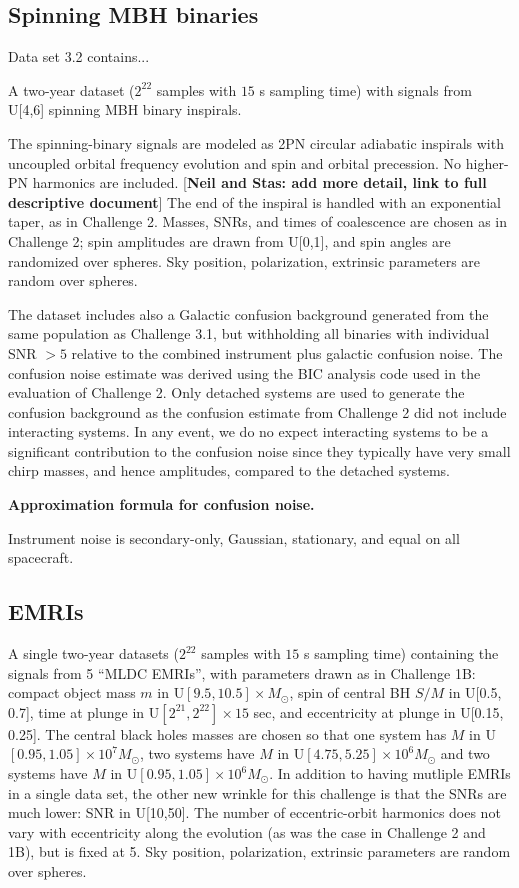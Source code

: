 \documentclass{iopart}
\begin{document}
\subsection{Spinning MBH binaries}
\label{sec:ch3mbh}

Data set 3.2 contains...

A two-year dataset ($2^{22}$ samples with $15$ s sampling time) with signals from U[4,6] spinning MBH binary inspirals.

The spinning-binary signals are modeled as 2PN circular adiabatic inspirals with uncoupled orbital frequency evolution
and spin and orbital precession. No higher-PN harmonics are included. [\textbf{Neil and Stas: add more detail, link to full descriptive document}] The end of the inspiral is handled with an exponential taper, as in Challenge 2. Masses, SNRs, and times of coalescence
are chosen as in Challenge 2; spin amplitudes are drawn from U[0,1], and spin angles are randomized over spheres.
Sky position, polarization, extrinsic parameters are random over spheres.

The dataset includes also a Galactic confusion background generated from the same population as Challenge 3.1, but withholding
all binaries with individual SNR $> 5$ relative to the combined instrument plus galactic confusion
noise. The confusion noise estimate was derived using the BIC analysis code used in the evaluation of Challenge 2.
Only detached systems are used to generate the confusion background as the confusion estimate from Challenge 2 did
not include interacting systems. In any event, we do no expect interacting systems to be a significant contribution
to the confusion noise since they typically have very small chirp masses, and hence amplitudes, compared to the detached systems.

\textbf{Approximation formula for confusion noise.}

Instrument noise is secondary-only, Gaussian, stationary, and equal on all spacecraft.

\subsection{EMRIs}
\label{sec:ch3emri}

A single two-year datasets ($2^{22}$ samples with $15$ s sampling time) containing the signals from 5 ``MLDC EMRIs'', with parameters drawn
as in Challenge 1B: compact object mass $m$ in U$[9.5, 10.5] \times M_{\odot}$, spin of central BH $S/M$ in U[0.5, 0.7], time at plunge
in U$[2^{21}, 2^{22}] \times 15$ sec, and eccentricity at plunge in U[0.15, 0.25]. The central black holes masses are chosen so that
one system has $M$ in U$[0.95, 1.05] \times 10^7 M_{\odot}$, two systems have $M$ in U$[4.75, 5.25] \times 10^6 M_{\odot}$ and
two systems have $M$ in U$[0.95, 1.05] \times 10^6 M_{\odot}$. In addition to having mutliple EMRIs in a single data set, the
other new wrinkle for this challenge is that the SNRs are much lower: SNR in U[10,50].
The number of eccentric-orbit harmonics does not vary with eccentricity
along the evolution (as was the case in Challenge 2 and 1B), but is fixed at 5. Sky position, polarization,
extrinsic parameters are random over spheres.
\end{document}
